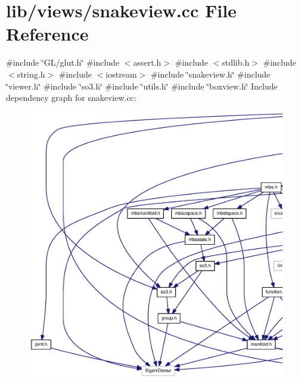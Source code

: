 \section{lib/views/snakeview.cc \-File \-Reference}
\label{snakeview_8cc}
{\ttfamily \#include \char`\"{}\-G\-L/glut.\-h\char`\"{}}\*
{\ttfamily \#include $<$assert.\-h$>$}\*
{\ttfamily \#include $<$stdlib.\-h$>$}\*
{\ttfamily \#include $<$string.\-h$>$}\*
{\ttfamily \#include $<$iostream$>$}\*
{\ttfamily \#include \char`\"{}snakeview.\-h\char`\"{}}\*
{\ttfamily \#include \char`\"{}viewer.\-h\char`\"{}}\*
{\ttfamily \#include \char`\"{}so3.\-h\char`\"{}}\*
{\ttfamily \#include \char`\"{}utils.\-h\char`\"{}}\*
{\ttfamily \#include \char`\"{}boxview.\-h\char`\"{}}\*
\-Include dependency graph for snakeview.\-cc\-:
\nopagebreak
\begin{figure}[H]
\begin{center}
\leavevmode
\includegraphics[width=350pt]{snakeview_8cc__incl}
\end{center}
\end{figure}
